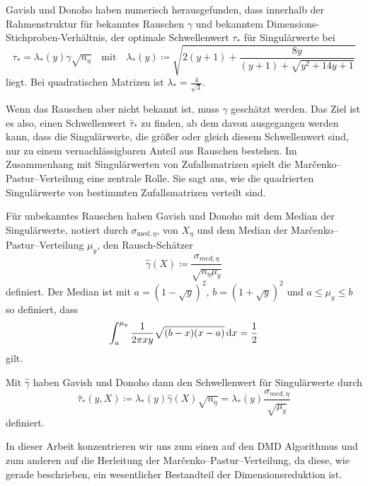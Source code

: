 \documentclass[../Bachelor_LennartKoliwer.tex]{subfiles}
\begin{document}
Gavish und Donoho haben numerisch herausgefunden, dass innerhalb der Rahmenstruktur für bekanntes Rauschen $\gamma$ und bekanntem Dimensions-Stichproben-Verhältnis, der optimale Schwellenwert $\tau_*$ für Singulärwerte bei
\[
    \tau_*=\lambda_*(y)\gamma\sqrt{n_\eta}\quad \text{mit}\quad \lambda_*(y) \coloneqq \sqrt{2(y+1)+\frac{8y}{(y+1)+\sqrt{y^2+14y+1}}}
\]
liegt. 
Bei quadratischen Matrizen ist $\lambda_*=\frac{4}{\sqrt{3}}$.

Wenn das Rauschen aber nicht bekannt ist, muss $\gamma$ geschätzt werden.
Das Ziel ist es also, einen Schwellenwert $\hat{\tau}_*$ zu finden, ab dem davon ausgegangen werden kann, dass die Singulärwerte, die größer oder gleich diesem Schwellenwert sind, nur zu einem vernachlässigbaren Anteil aus Rauschen bestehen.
Im Zusammenhang mit Singulärwerten von Zufallsmatrizen spielt die Mar\v{c}enko--Pastur--Verteilung eine zentrale Rolle.
Sie sagt aus, wie die quadrierten Singulärwerte von bestimmten Zufallsmatrizen verteilt sind.

Für unbekanntes Rauschen haben Gavish und Donoho mit dem Median der Singulär\-werte, notiert durch $\sigma_{\text{med},\eta}$, von $X_\eta$ und dem Median der Mar\v{c}enko--Pastur--Verteilung $\mu_y$, den Rausch-Schätzer 
\[
    \hat{\gamma}(X) \coloneqq \frac{\sigma_{med,\eta}}{\sqrt{n_\eta\mu_y}}
\]
definiert. 
Der Median ist mit $a=\left(1-\sqrt{y}\right)^2$, $b=\left(1+\sqrt{y}\right)^2$ und $a\leq\mu_y\leq b$ so definiert, dass
\[
    \int_{a}^{\mu_y}\frac{1}{2\pi x y}\sqrt{(b-x)(x-a)}\,\text{d} x = \frac12
\]
gilt.

Mit $\hat{\gamma}$ haben Gavish und Donoho dann den Schwellenwert für Singulärwerte durch
\[
    \hat{\tau}_*(y,X)\coloneqq \lambda_*(y)\hat{\gamma}(X)\sqrt{n_\eta} = \lambda_*(y)\frac{\sigma_{med,\eta}}{\sqrt{\mu_y}}
\]
definiert.

In dieser Arbeit konzentrieren wir uns zum einen auf den DMD Algorithmus und zum anderen auf die Herleitung der Mar\v{c}enko--Pastur--Verteilung, da diese, wie gerade beschrieben, ein wesentlicher Bestandteil der Dimensionsreduktion ist.
\end{document}
